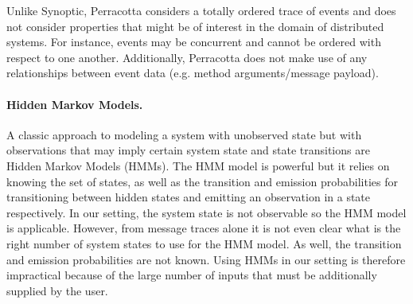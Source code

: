 Unlike Synoptic, Perracotta considers a totally ordered trace of
events and does not consider properties that might be of interest in
the domain of distributed systems. For instance, events may be
concurrent and cannot be ordered with respect to one
another. Additionally, Perracotta does not make use of any
relationships between event data (e.g. method arguments/message
payload).

\paragraph{Hidden Markov Models.} A classic approach to modeling a
system with unobserved state but with observations that may imply
certain system state and state transitions are Hidden Markov Models
(HMMs). The HMM model is powerful but it relies on knowing the set of
states, as well as the transition and emission probabilities for
transitioning between hidden states and emitting an observation in a
state respectively. In our setting, the system state is not observable
so the HMM model is applicable. However, from message traces alone it
is not even clear what is the right number of system states to use for
the HMM model. As well, the transition and emission probabilities are
not known. Using HMMs in our setting is therefore impractical because
of the large number of inputs that must be additionally supplied by
the user.


